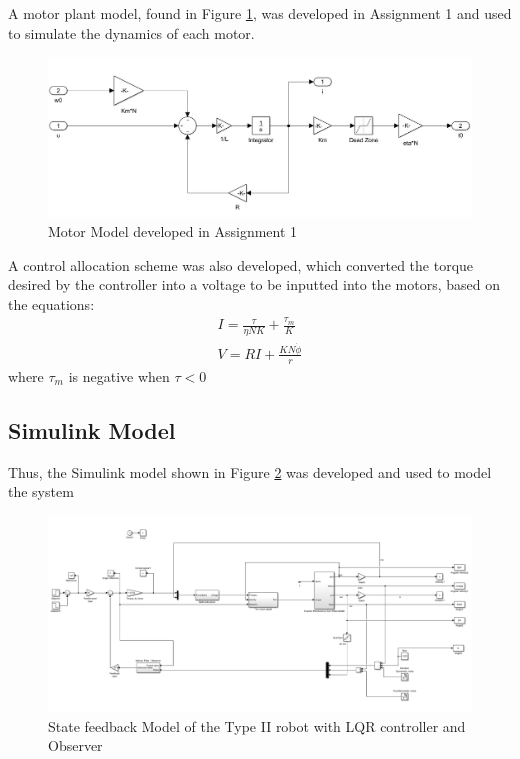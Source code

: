 \documentclass{UoNMCHA}
\numberwithin{equation}{section}
\begin{document}
A motor plant model, found in Figure \ref{Motormodel}, was developed in Assignment 1 and used to simulate the dynamics of each motor.\\

\begin{figure}[!h]
	\begin{center}
		\includegraphics[width=.5\linewidth]{figs/gearbox}
		\caption{Motor Model developed in Assignment 1}
		\label{Motormodel}
	\end{center}
\end{figure}

A control allocation scheme was also developed, which converted the torque desired by the controller into a voltage to be inputted into the motors, based on the equations:
\begin{equation}
\begin{split}
I = \frac{\tau}{\eta NK} + \frac{\tau_{m}}{K} \\
V = RI + \frac{KN\dot{\phi}}{r}
\end{split}
\end{equation}
where $\tau_{m}$ is negative when $\tau<0$   

\newpage
\subsection{Simulink Model}
Thus, the Simulink model shown in Figure \ref{simulink} was developed and used to model the system

\begin{figure}[!h]
	\begin{center}
		\includegraphics[width=.9\linewidth]{figs/simulink}
		\caption{State feedback Model of the Type II robot with LQR controller and Observer }
		\label{simulink}
	\end{center}
\end{figure}
\end{document}
